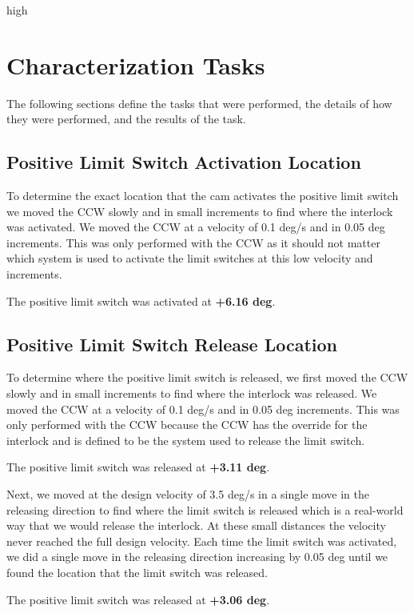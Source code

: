 high\documentclass[SE,lsstdraft,authoryear,toc]{lsstdoc}
\begin{document}
\section{Characterization Tasks}\label{sec:Characterization Tasks}

The following sections define the tasks that were performed, the details
of how they were performed, and the results of the task.

\subsection{Positive Limit Switch Activation Location}

To determine the exact location that the cam activates the positive
limit switch we moved the CCW slowly and in small increments to find
where the interlock was activated. We moved the CCW at a velocity of 0.1
deg/s and in 0.05 deg increments. This was only performed with the CCW
as it should not matter which system is used to activate the limit
switches at this low velocity and increments.

The positive limit switch was activated at \textbf{+6.16 deg}.

\subsection{Positive Limit Switch Release Location}

To determine where the positive limit switch is released, we first moved
the CCW slowly and in small increments to find where the interlock was
released. We moved the CCW at a velocity of 0.1 deg/s and in 0.05 deg
increments. This was only performed with the CCW because the CCW has the
override for the interlock and is defined to be the system used to
release the limit switch.

The positive limit switch was released at \textbf{+3.11 deg}.

Next, we moved at the design velocity of 3.5 deg/s in a single move in
the releasing direction to find where the limit switch is released which
is a real-world way that we would release the interlock. At these small
distances the velocity never reached the full design velocity. Each time
the limit switch was activated, we did a single move in the releasing
direction increasing by 0.05 deg until we found the location that the
limit switch was released.

The positive limit switch was released at \textbf{+3.06 deg}.
\end{document}
